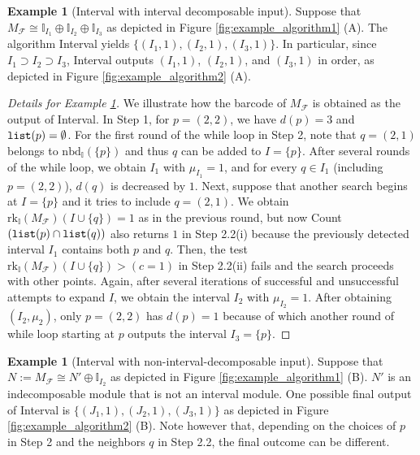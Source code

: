 \documentclass[11pt]{article}
\theoremstyle{definition}
\newtheorem{example}[theorem]{Example}
\newcommand{\intnbd}{\mathrm{nbd}_{\mathbb{I}}}
\newcommand{\intrk}{\mathrm{rk}_{\mathbb{I}}}
\newcommand{\I}{\mathbb{I}}
\newcommand{\Fcal}{\mathcal{F}}
\begin{document}
\begin{example}[{\sc Interval} with interval decomposable input]\label{ex:intervals}
Suppose that $M_{\Fcal}\cong \I_{I_1}\oplus \I_{I_2}\oplus\I_{I_3}$ as depicted in Figure \ref{fig:example_algorithm1} (A). The algorithm {\sc Interval} yields $\{(I_1,1),(I_2,1),(I_3,1)\}$. In particular, since $I_1\supset I_2 \supset I_3$, {\sc Interval} outputs $(I_1,1)$, $(I_2,1)$, and $(I_3,1)$ in order, as depicted in Figure \ref{fig:example_algorithm2} (A).
\end{example}


\begin{proof}[Details for Example \ref{ex:intervals}]
We illustrate how the barcode of $M_{\Fcal}$ is obtained as the output of {\sc Interval}. In Step 1, for $p=(2,2)$, we have $d(p)=3$ and ${\tt list}(p)=\emptyset$. For the first round of the while loop in Step 2, note that $q=(2,1)$ belongs to $\intnbd(\{p\})$ and thus $q$ can be added to $I=\{p\}$. After several rounds of the while loop, we obtain $I_1$ with $\mu_{I_1}=1$, and for every $q\in I_1$ (including $p=(2,2)$), $d(q)$ is decreased by $1$. Next, suppose that another search begins at $I=\{p\}$ and
it tries to include $q=(2,1)$. We obtain $\intrk(M_{\Fcal})(I\cup\{q\})=1$ as in the previous round, but now {\sc Count}$({\tt list}(p)\cap {\tt list}(q))$ also returns $1$ in Step 2.2(i) because the previously detected interval $I_1$ contains both $p$ and $q$. 
Then, the test $\intrk(M_{\Fcal})(I\cup\{q\})> (c=1)$ in Step 2.2(ii) fails and
the search proceeds with other points. Again, after several iterations of successful
and unsuccessful attempts to expand $I$, we obtain the interval $I_2$ with $\mu_{I_2}=1$. After obtaining $(I_2,\mu_2)$, only $p=(2,2)$ has $d(p)=1$ because
of which another round of while loop starting at $p$ outputs the interval $I_3=\{p\}$.
\end{proof}



\begin{example}[{\sc Interval} with non-interval-decomposable input]\label{ex:intervals2}Suppose that $N:=M_{\Fcal}\cong N'\oplus \I_{I_2}$ as depicted in Figure \ref{fig:example_algorithm1} (B). $N'$ is an indecomposable module that is not an interval module. One possible final output of {\sc Interval} is $\{(J_1,1),(J_2,1),(J_3,1)\}$ as depicted in Figure \ref{fig:example_algorithm2} (B). Note however that, depending on the choices of $p$ in Step 2 and the neighbors $q$ in Step 2.2, the final outcome can be different.
\end{example}
\end{document}
